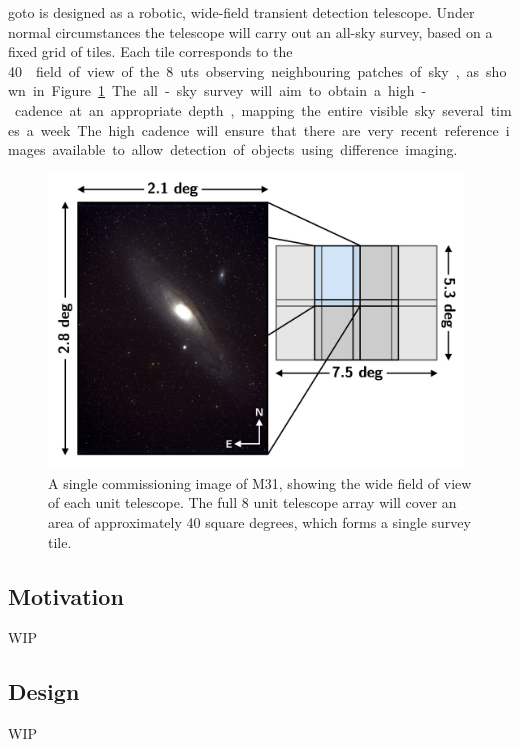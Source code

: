 \begin{colsection}
\begin{colsection}
\gls{goto} is designed as a robotic, wide-field transient detection telescope. Under normal circumstances the telescope will carry out an all-sky survey, based on a fixed grid of tiles. Each tile corresponds to the \SI{40}{\square\deg} field of view of the 8 \glspl{ut} observing neighbouring patches of sky, as shown in Figure~\ref{fig:tiles}. The all-sky survey will aim to obtain a high-cadence at an appropriate depth, mapping the entire visible sky several times a week. The high cadence will ensure that there are very recent reference images available to allow detection of objects using difference imaging.

\begin{figure}[htb]
\begin{center}
\includegraphics[width=11cm]{images/tiles.pdf}
\end{center}
\caption[M31]{A single commissioning image of M31, showing the wide field of view of each unit telescope. The full 8 unit telescope array will cover an area of approximately 40 square degrees, which forms a single survey tile.}
\label{fig:tiles}
\end{figure}

\end{colsection}

\subsection{Motivation}
\label{sec:goto_motivation}
\begin{colsection}

WIP

\end{colsection}

\subsection{Design}
\label{sec:goto_design}
\begin{colsection}

WIP

\end{colsection}


\end{colsection}

